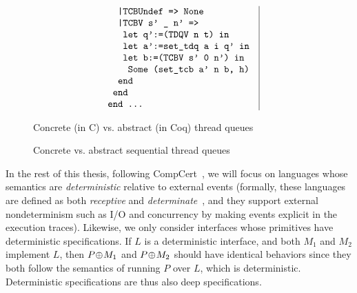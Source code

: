 {\begin{figure}[t]
$$\begin{array}{l|l}
\begin{array}[t]{l}
\verb+  |TCBUndef => None+\\
\verb+  |TCBV s' _ n' =>+\\
\verb+   let q':=(TDQV n t) in+\\
\verb+   let a':=set_tdq a i q' in+\\
\verb+   let b:=(TCBV s' 0 n') in+\\
\verb+    Some (set_tcb a' n b, h)+\\
\verb+  end+\\
\verb+ end+\\
\verb+end ...+
\end{array}
\end{array}
$$ 
\caption{Concrete (in C) vs. abstract (in Coq) thread queues}
\label{fig:queue}
\end{figure}}

\begin{figure}[tb]\centering
\subfloat[Concrete implementation in C]{
\label{fig:queue:a}
    \begin{minipage}{0.5\textwidth}
    \centering
 = C] {source_code/seq-dequeue.c}
    \end{minipage}
}
\subfloat[Abstract specification in Coq]
{\label{fig:queue:b}
    \begin{minipage}{0.5\textwidth}
    \centering
 = C] {source_code/seq-dequeue.v}
  \end{minipage}
}\caption{Concrete vs. abstract sequential thread queues}
\hrulefill
\label{fig:queue}
\end{figure}

In the rest of this thesis, following CompCert~\cite{Leroy-backend}, we
will focus on languages whose semantics are {\em
  deterministic} relative to external events (formally, these
languages are defined as both {\em receptive} and {\em
  determinate}~\cite{sevcik13}, and they support external
nondeterminism such as I/O and concurrency by making events explicit 
in the execution traces).
Likewise, we only consider interfaces whose primitives
have deterministic specifications. If $L$ is a deterministic interface, 
and both $M_1$ and $M_2$ implement $L$, then $P\!\oplus\! M_1$ and $P\!\oplus\! M_2$
should have identical behaviors since they both follow the semantics
of running $P$ over $L$, which is deterministic. Deterministic 
specifications are thus also deep specifications.

